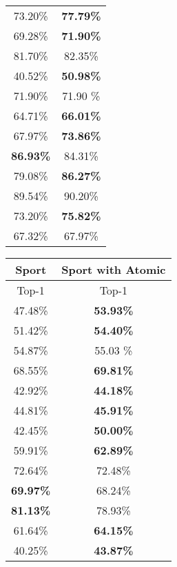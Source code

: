 \documentclass[10pt,twocolumn,letterpaper]{article}
\begin{document}
\begin{table*}[hbt!]
\begin{center}
\begin{tabular}{|c|c|}
             73.20\% & \bf{77.79}\%  \\
             69.28\% & \bf{71.90}\%  \\
             81.70\% &     82.35\%   \\
            \hline
             40.52\% & \bf{50.98}\%  \\
             71.90\% &     71.90 \%  \\
             64.71\% & \bf{66.01}\%  \\
             67.97\% & \bf{73.86}\%  \\
            \hline
             \bf{86.93}\% & 84.31\%  \\
             79.08\% & \bf{86.27}\%  \\
             89.54\% & 90.20\%  \\
            \hline
             73.20\% & \bf{75.82}\%  \\
            \hline
             67.32\% & 67.97\%  \\
             \hline
        \end{tabular}
\endminipage
{}
        \begin{tabular}{|c|c|}
            \hline
            \multicolumn{1}{|c|}{Sport} &
            \multicolumn{1}{|c|}{Sport with Atomic} \\
            \hline
            Top-1 & Top-1  \\
            \hline
             47.48\% & \bf{53.93}\%  \\
             51.42\% & \bf{54.40}\%  \\
             54.87\% &     55.03 \%  \\
             68.55\% & \bf{69.81}\%   \\
            \hline
             42.92\% & \bf{44.18}\%  \\
             44.81\% & \bf{45.91}\%  \\
             42.45\% & \bf{50.00}\%  \\
             59.91\% & \bf{62.89}\%  \\
            \hline
             72.64\% & 72.48\%  \\
             \bf{69.97}\% & 68.24\%  \\
             \bf{81.13}\% & 78.93\%  \\
            \hline
             61.64\% & \bf{64.15}\%  \\
            \hline
             40.25\% & \bf{43.87}\%  \\
             \hline
        \end{tabular}
\endminipage
\end{center}
\caption{ \textbf{Left} : HAA500 trained over different models. \textbf{Right} : Composite action detection accuracy of different models when they are trained with/without atomic action detection. Numbers are bolded when the difference is larger than 1\%.}
\label{table:Experiments}

\end{table*}
\end{document}
